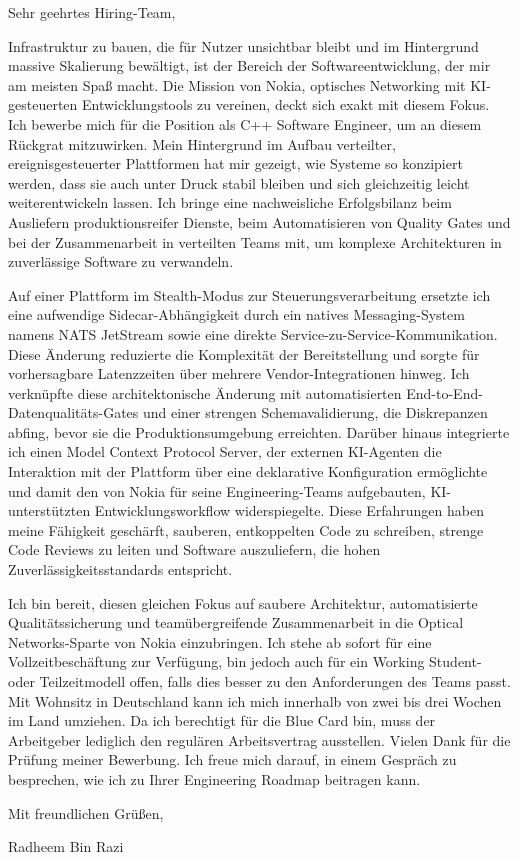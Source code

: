 \documentclass[11pt,a4paper]{coverletter}
\begin{document}
\opening{Sehr geehrtes Hiring-Team,}

Infrastruktur zu bauen, die für Nutzer unsichtbar bleibt und im Hintergrund massive Skalierung bewältigt, ist der Bereich der Softwareentwicklung, der mir am meisten Spaß macht. Die Mission von Nokia, optisches Networking mit KI-gesteuerten Entwicklungstools zu vereinen, deckt sich exakt mit diesem Fokus. Ich bewerbe mich für die Position als C++ Software Engineer, um an diesem Rückgrat mitzuwirken. Mein Hintergrund im Aufbau verteilter, ereignisgesteuerter Plattformen hat mir gezeigt, wie Systeme so konzipiert werden, dass sie auch unter Druck stabil bleiben und sich gleichzeitig leicht weiterentwickeln lassen. Ich bringe eine nachweisliche Erfolgsbilanz beim Ausliefern produktionsreifer Dienste, beim Automatisieren von Quality Gates und bei der Zusammenarbeit in verteilten Teams mit, um komplexe Architekturen in zuverlässige Software zu verwandeln.

Auf einer Plattform im Stealth-Modus zur Steuerungsverarbeitung ersetzte ich eine aufwendige Sidecar-Abhängigkeit durch ein natives Messaging-System namens NATS JetStream sowie eine direkte Service-zu-Service-Kommunikation. Diese Änderung reduzierte die Komplexität der Bereitstellung und sorgte für vorhersagbare Latenzzeiten über mehrere Vendor-Integrationen hinweg. Ich verknüpfte diese architektonische Änderung mit automatisierten End-to-End-Datenqualitäts-Gates und einer strengen Schemavalidierung, die Diskrepanzen abfing, bevor sie die Produktionsumgebung erreichten. Darüber hinaus integrierte ich einen Model Context Protocol Server, der externen KI-Agenten die Interaktion mit der Plattform über eine deklarative Konfiguration ermöglichte und damit den von Nokia für seine Engineering-Teams aufgebauten, KI-unterstützten Entwicklungsworkflow widerspiegelte. Diese Erfahrungen haben meine Fähigkeit geschärft, sauberen, entkoppelten Code zu schreiben, strenge Code Reviews zu leiten und Software auszuliefern, die hohen Zuverlässigkeitsstandards entspricht.

Ich bin bereit, diesen gleichen Fokus auf saubere Architektur, automatisierte Qualitätssicherung und teamübergreifende Zusammenarbeit in die Optical Networks-Sparte von Nokia einzubringen. Ich stehe ab sofort für eine Vollzeitbeschäftung zur Verfügung, bin jedoch auch für ein Working Student- oder Teilzeitmodell offen, falls dies besser zu den Anforderungen des Teams passt. Mit Wohnsitz in Deutschland kann ich mich innerhalb von zwei bis drei Wochen im Land umziehen. Da ich berechtigt für die Blue Card bin, muss der Arbeitgeber lediglich den regulären Arbeitsvertrag ausstellen. Vielen Dank für die Prüfung meiner Bewerbung. Ich freue mich darauf, in einem Gespräch zu besprechen, wie ich zu Ihrer Engineering Roadmap beitragen kann.

\closing{Mit freundlichen Grüßen,}{Radheem Bin Razi}
\end{document}
